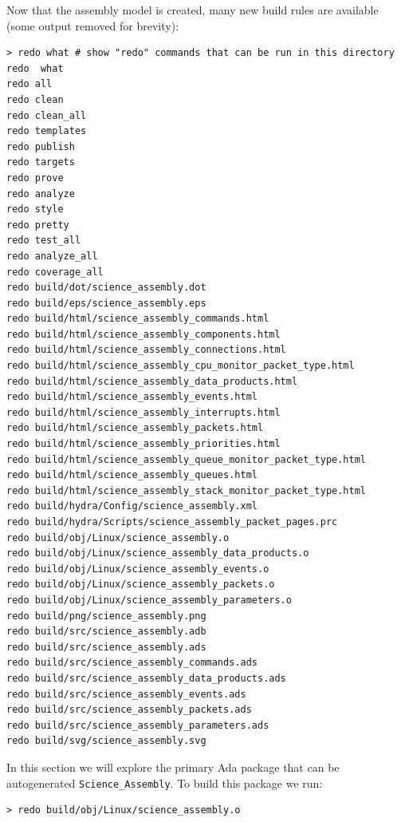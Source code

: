 Now that the assembly model is created, many new build rules are available (some output removed for brevity):

\vspace{5mm} %
\begin{verbatim}
> redo what # show "redo" commands that can be run in this directory
redo  what
redo all
redo clean
redo clean_all
redo templates
redo publish
redo targets
redo prove
redo analyze
redo style
redo pretty
redo test_all
redo analyze_all
redo coverage_all
redo build/dot/science_assembly.dot
redo build/eps/science_assembly.eps
redo build/html/science_assembly_commands.html
redo build/html/science_assembly_components.html
redo build/html/science_assembly_connections.html
redo build/html/science_assembly_cpu_monitor_packet_type.html
redo build/html/science_assembly_data_products.html
redo build/html/science_assembly_events.html
redo build/html/science_assembly_interrupts.html
redo build/html/science_assembly_packets.html
redo build/html/science_assembly_priorities.html
redo build/html/science_assembly_queue_monitor_packet_type.html
redo build/html/science_assembly_queues.html
redo build/html/science_assembly_stack_monitor_packet_type.html
redo build/hydra/Config/science_assembly.xml
redo build/hydra/Scripts/science_assembly_packet_pages.prc
redo build/obj/Linux/science_assembly.o
redo build/obj/Linux/science_assembly_data_products.o
redo build/obj/Linux/science_assembly_events.o
redo build/obj/Linux/science_assembly_packets.o
redo build/obj/Linux/science_assembly_parameters.o
redo build/png/science_assembly.png
redo build/src/science_assembly.adb
redo build/src/science_assembly.ads
redo build/src/science_assembly_commands.ads
redo build/src/science_assembly_data_products.ads
redo build/src/science_assembly_events.ads
redo build/src/science_assembly_packets.ads
redo build/src/science_assembly_parameters.ads
redo build/svg/science_assembly.svg
\end{verbatim}
\vspace{5mm} %

In this section we will explore the primary Ada package that can be autogenerated \texttt{Science\_Assembly}. To build this package we run:

\vspace{5mm} %
\begin{verbatim}
> redo build/obj/Linux/science_assembly.o
\end{verbatim}
\vspace{5mm} %

